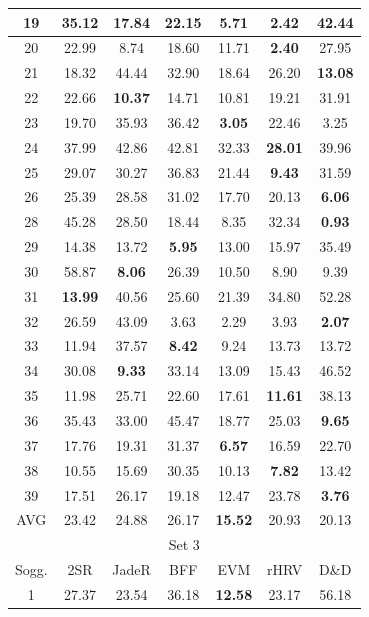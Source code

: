 \documentclass[journal,A4paper,compsoc,epsfig]{IEEEtran}
\begin{document}
\begin{table}
\begin{tabular}{|c||c|c|c|c|c|c|}
        19 &35.12 &17.84 &22.15 &5.71 &\textbf{2.42} &42.44 \\ \hline
        20 &22.99 &8.74 &18.60 &11.71 &\textbf{2.40} &27.95 \\ \hline
        21 &18.32 &44.44 &32.90 &18.64 &26.20 &\textbf{13.08} \\ \hline
        22 &22.66 &\textbf{10.37} &14.71 &10.81 &19.21 &31.91 \\ \hline
        23 &19.70 &35.93 &36.42 &\textbf{3.05} &22.46 &3.25 \\ \hline
        24 &37.99 &42.86 &42.81 &32.33 &\textbf{28.01} &39.96 \\ \hline
        25 &29.07 &30.27 &36.83 &21.44 &\textbf{9.43} &31.59 \\ \hline
        26 &25.39 &28.58 &31.02 &17.70 &20.13 &\textbf{6.06} \\ \hline
        28 &45.28 &28.50 &18.44 &8.35 &32.34 &\textbf{0.93} \\ \hline
        29 &14.38 &13.72 &\textbf{5.95} &13.00 &15.97 &35.49 \\ \hline
        30 &58.87 &\textbf{8.06} &26.39 &10.50 &8.90 &9.39 \\ \hline
        31 &\textbf{13.99} &40.56 &25.60 &21.39 &34.80 &52.28 \\ \hline
        32 &26.59 &43.09 &3.63 &2.29 &3.93 &\textbf{2.07} \\ \hline
        33 &11.94 &37.57 &\textbf{8.42} &9.24 &13.73 &13.72 \\ \hline
        34 &30.08 &\textbf{9.33} &33.14 &13.09 &15.43 &46.52 \\ \hline
        35 &11.98 &25.71 &22.60 &17.61 &\textbf{11.61} &38.13 \\ \hline
        36 &35.43 &33.00 &45.47 &18.77 &25.03 &\textbf{9.65} \\ \hline
        37 &17.76 &19.31 &31.37 &\textbf{6.57} &16.59 &22.70 \\ \hline
        38 &10.55 &15.69 &30.35 &10.13 &\textbf{7.82} &13.42 \\ \hline
        39 &17.51 &26.17 &19.18 &12.47 &23.78 &\textbf{3.76} \\ \hline
        AVG &23.42 &24.88 &26.17 &\textbf{15.52} &20.93 &20.13 \\ \hline
        \multicolumn{7}{|c|}{Set 3} \\ \hline
        Sogg. &2SR &JadeR &BFF &EVM &rHRV &D\&D \\ \hline
        1 &27.37 &23.54 &36.18 &\textbf{12.58} &23.17 &56.18 \\ \hline

\end{tabular}
\end{table}
\end{document}
